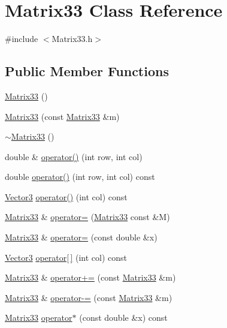 \section{Matrix33 Class Reference}
\label{classMatrix33}


{\ttfamily \#include $<$Matrix33.h$>$}

\subsection*{Public Member Functions}
\begin{DoxyCompactItemize}
\item 
\hyperlink{classMatrix33_a70acb6647b172d017cc4265a29a7d263}{Matrix33} ()
\item 
\hyperlink{classMatrix33_a1eafb2bf90a35223f076b2d404edc99e}{Matrix33} (const \hyperlink{classMatrix33}{Matrix33} \&m)
\item 
\hyperlink{classMatrix33_a5b1c63abd514549038c8156027d6c490}{$\sim$Matrix33} ()
\item 
double \& \hyperlink{classMatrix33_ab921fd61eae77695c74779bb8680580c}{operator()} (int row, int col)
\item 
double \hyperlink{classMatrix33_a8f0502ab1277c6bb2c95e04046e1ce70}{operator()} (int row, int col) const 
\item 
\hyperlink{classVector3}{Vector3} \hyperlink{classMatrix33_a862f4adceda842d6dcf2caefe18e42fe}{operator()} (int col) const 
\item 
\hyperlink{classMatrix33}{Matrix33} \& \hyperlink{classMatrix33_a8ccac0dc2c3d499ee0a1dded37f2e013}{operator=} (\hyperlink{classMatrix33}{Matrix33} const \&M)
\item 
\hyperlink{classMatrix33}{Matrix33} \& \hyperlink{classMatrix33_a3e31a5aca7eec3b0ff5cd288f59b4b2e}{operator=} (const double \&x)
\item 
\hyperlink{classVector3}{Vector3} \hyperlink{classMatrix33_abe2e16fd1847f3fd356d3c498fc1002b}{operator\mbox{[}$\,$\mbox{]}} (int col) const 
\item 
\hyperlink{classMatrix33}{Matrix33} \& \hyperlink{classMatrix33_a2f478995122658b96e587c48796eddfc}{operator+=} (const \hyperlink{classMatrix33}{Matrix33} \&m)
\item 
\hyperlink{classMatrix33}{Matrix33} \& \hyperlink{classMatrix33_ac00458342245fbc74a35c8b486e4bdce}{operator-\/=} (const \hyperlink{classMatrix33}{Matrix33} \&m)
\item 
\hyperlink{classMatrix33}{Matrix33} \hyperlink{classMatrix33_af1ac3200903b2c90ef89344ab6dff516}{operator$\ast$} (const double \&x) const 

\end{DoxyCompactItemize}
